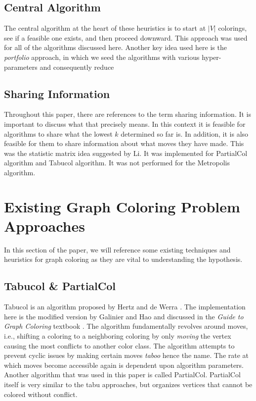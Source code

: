 \documentclass[runningheads]{llncs}
\begin{document}
\subsection{Central Algorithm}

The central algorithm at the heart of these heuristics is to start at $|V|$ colorings, see if a feasible one exists, and then proceed downward. This approach was used for all of the algorithms discussed here. Another key idea used here is the \emph{portfolio} approach, in which we seed the algorithms with various hyper-parameters and consequently reduce

\subsection{Sharing Information}
Throughout this paper, there are references to the term sharing information. It is important to discuss what that precisely means. In this context it is feasible for algorithms to share what the lowest $k$ determined so far is. In addition, it is also feasible for them to share information about what moves they have made. This was the statistic matrix idea suggested by Li. \cite{https://doi.org/10.5445/ir/1000083192} It was implemented for PartialCol algorithm and Tabucol algorithm. It was not performed for the Metropolis algorithm.

\section{Existing Graph Coloring Problem Approaches }

In this section of the paper, we will reference some existing techniques and heuristics for graph coloring as they are vital to understanding the hypothesis.

\subsection{Tabucol \& PartialCol}\label{AA}
Tabucol is an algorithm proposed by Hertz and de Werra \cite{hdw}. The implementation here is the modified version by Galinier and Hao \cite{TabuCol} and discussed in the \emph{Guide to Graph Coloring} textbook \cite{10.5555/2851123}. The algorithm fundamentally revolves around moves, i.e., shifting a coloring to a neighboring coloring by only \emph{moving} the vertex causing the most conflicts to another color class. The algorithm attempts to prevent cyclic issues by making certain moves \emph{taboo} hence the name. The rate at which moves become accessible again is dependent upon algorithm parameters. Another algorithm that was used in this paper is called PartialCol. PartialCol itself is very similar to the tabu approaches, but organizes vertices that cannot be colored without conflict.
\end{document}
